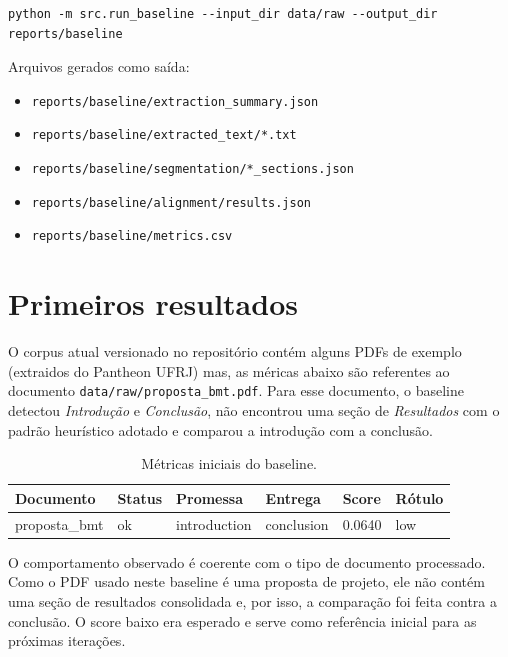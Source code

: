\documentclass[12pt]{article}
\begin{document}
\begin{lstlisting}[breaklines=true]
python -m src.run_baseline --input_dir data/raw --output_dir reports/baseline
\end{lstlisting}



Arquivos gerados como saída:

\begin{itemize}
    \item \texttt{reports/baseline/extraction\_summary.json}
    \item \texttt{reports/baseline/extracted\_text/*.txt}
    \item \texttt{reports/baseline/segmentation/*\_sections.json}
    \item \texttt{reports/baseline/alignment/results.json}
    \item \texttt{reports/baseline/metrics.csv}
\end{itemize}

\section{Primeiros resultados}

O corpus atual versionado no repositório contém alguns PDFs de exemplo (extraidos do Pantheon UFRJ) mas, as méricas abaixo são referentes ao documento \texttt{data/raw/proposta\_bmt.pdf}. Para esse documento, o baseline detectou \textit{Introdução} e \textit{Conclusão}, não encontrou uma seção de \textit{Resultados} com o padrão heurístico adotado e comparou a introdução com a conclusão.

\begin{table}[h]
    \centering
    \begin{tabular}{llllll}
        \toprule
        Documento & Status & Promessa & Entrega & Score & Rótulo \\
        \midrule
        proposta\_bmt & ok & introduction & conclusion & 0.0640 & low \\
        \bottomrule
    \end{tabular}
    \caption{Métricas iniciais do baseline.}
\end{table}

O comportamento observado é coerente com o tipo de documento processado. Como o PDF usado neste baseline é uma proposta de projeto, ele não contém uma seção de resultados consolidada e, por isso, a comparação foi feita contra a conclusão. O score baixo era esperado e serve como referência inicial para as próximas iterações.
\end{document}
